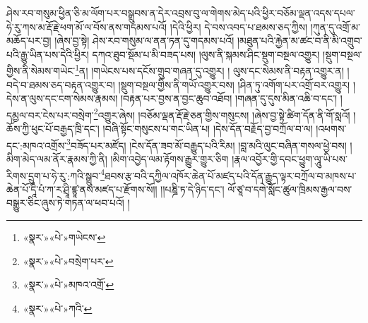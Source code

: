 ཤེས་རབ་གསུམ་ཕྱིན་ཅི་མ་ལོག་པར་བསྒྲུབས་ན་དེར་འབྲས་བུ་ལ་གེགས་མེད་པའི་ཕྱིར་བཅོམ་ལྡན་འདས་དཔལ་ཧེ་རུ་ཀས་མ་རྡོ་རྗེ་ཕག་མོ་ལ་བོས་ནས་གདམས་པའོ། །དེའི་ཕྱིར། དེ་བས་འབད་པ་ཐམས་ཅད་ཀྱིས། །ཀུན་དུ་འགྲོ་མ་མཆོད་པར་བྱ། །ཞེས་བྱ་སྟེ། ཤེས་རབ་གསུམ་ལ་ནན་ཏན་དུ་གདམས་པའོ། །མཐུན་པའི་རྐྱེན་མ་ཚང་བ་ནི་མི་འགྲུབ་པའི་རྒྱུ་ཡིན་པས་དེའི་ཕྱིར། དཀའ་ཐུབ་སྡོམ་པ་མི་བཟད་པས། །ལུས་ནི་སྐམས་ཤིང་སྡུག་བསྔལ་འགྱུར། །སྡུག་བསྔལ་གྱིས་ནི་སེམས་གཡེང་\footnote{«སྣར་»«པེ་»གཡེངས་}ན། །གཡེངས་པས་དངོས་གྲུབ་གཞན་དུ་འགྱུར། །
ལུས་དང་སེམས་ནི་བརྟན་འགྱུར་ན། །བདེ་བ་ཐམས་ཅད་བརྟན་འགྱུར་བ། །སྡུག་བསྔལ་གྱིས་ནི་གཡོ་འགྱུར་བས། །ཤིན་ཏུ་འགོག་པར་འགྲོ་བར་འགྱུར། །དེས་ན་ལུས་དང་ངག་སེམས་རྣམས། །བརྟན་པར་བྱས་ན་བྱང་ཆུབ་འཐོབ། །གཞན་དུ་དུས་མིན་འཆི་བ་དང་། །དམྱལ་བར་ངེས་པར་བསྲེག་\footnote{«སྣར་»«པེ་»བསྲེག་པར་}འགྱུར་ཞེས། །བཅོམ་ལྡན་རྡོ་རྗེ་ཅན་གྱིས་གསུངས། །ཞེས་བྱ་སྟེ་ཚིག་དོན་ནི་གོ་སླའོ། །ཆོས་ཀྱི་ཕུང་པོ་བརྒྱད་ཁྲི་དང་། །བཞི་སྟོང་གསུངས་པ་གང་ཡིན་པ། །དེས་དོན་བརྗོད་བྱ་བཀྲོལ་བ་ལ། །འཕགས་དང་:མཁའ་འགྲོས་\footnote{«སྣར་»«པེ་»མཁའ་འགྲོ་}བཟོད་པར་མཛོད། །ངེས་དོན་ཟབ་མོ་བརྒྱུད་པའི་རིམ། །བླ་མའི་ལུང་བཞིན་གསལ་ཕྱེ་བས། །མིག་མེད་ལམ་ནོར་རྣམས་ཀྱི་ནི། །མིག་འབྱེད་ལམ་རྟོགས་རྒྱུར་གྱུར་ཅིག །རྣལ་འབྱོར་གྱི་དབང་ཕྱུག་ལཱུ་ཡི་པས་རིགས་དྲུག་པ་ཧེ་རུ་:ཀའི་སྒྲུབ་\footnote{«སྣར་»«པེ་»ཀའི་}ཐབས་རྩ་བའི་དཀྱིལ་འཁོར་ཆེན་པོ་མཛད་པའི་དོན་རྒྱུད་ལྟར་བཀྲོལ་བ་མཁས་པ་ཆེན་པོ་དཱི་པཾ་ཀ་ར་ཤྲཱི་ཛྙཱ་ནས་མཛད་པ་རྫོགས་སོ།། །།པཎྜི་ཏ་དེ་ཉིད་དང་། ལོ་ཙཱ་བ་དགེ་སློང་ཚུལ་ཁྲིམས་རྒྱལ་བས་བསྒྱུར་ཅིང་ཞུས་ཏེ་གཏན་ལ་ཕབ་པའོ། ། 